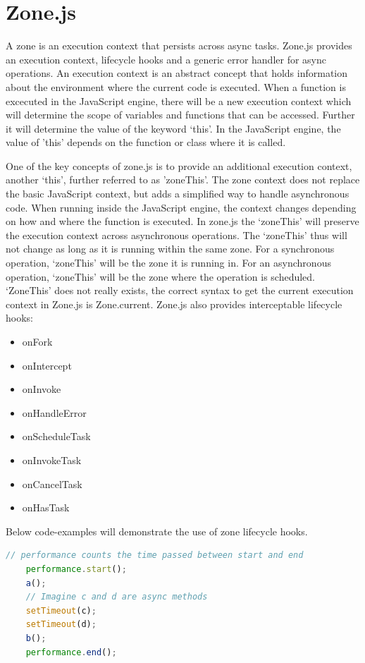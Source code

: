 \autocite{AngularRxjs}

\section{Zone.js}
A zone is an execution context that persists across async tasks. Zone.js provides an execution context, lifecycle hooks and a generic error handler for async operations. An execution context is an abstract concept that holds information about the environment where the current code is executed. When a function is excecuted in the JavaScript engine, there will be a new execution context which will determine the scope of variables and functions that can be accessed. Further it will determine the value of the keyword ‘this’. In the JavaScript engine, the value of 'this' depends on the function or class where it is called.
\autocite{ngHouston2019}

One of the key concepts of zone.js is to provide an additional execution context, another ‘this’, further referred to as 'zoneThis'. The zone context does not replace the basic JavaScript context, but adds a simplified way to handle asynchronous code. When running inside the JavaScript engine, the context changes depending on how and where the function is executed. In zone.js the ‘zoneThis’ will preserve the execution context across asynchronous operations. The ‘zoneThis’ thus will not change as long as it is running within the same zone. For a synchronous operation, ‘zoneThis’ will be the zone it is running in. For an asynchronous operation, ‘zoneThis’ will be the zone where the operation is scheduled. ‘ZoneThis’ does not really exists, the correct syntax to get the current execution context in Zone.js is Zone.current.
Zone.js also provides interceptable lifecycle hooks:
\begin{itemize}
	\item onFork
	\item onIntercept
	\item onInvoke
	\item onHandleError
	\item onScheduleTask
	\item onInvokeTask
	\item onCancelTask
	\item onHasTask
\end{itemize}

Below code-examples will demonstrate the use of zone lifecycle hooks.

\begin{lstlisting}[language=Javascript]
	// performance counts the time passed between start and end
	performance.start();
	a();
	// Imagine c and d are async methods
	setTimeout(c);
	setTimeout(d);
	b();
	performance.end();
\end{lstlisting}
\autocite{ngHouston2019}


